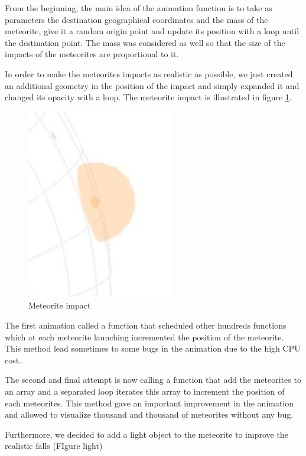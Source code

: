 \documentclass[10pt,conference,compsocconf]{IEEEtran}
\begin{document}
From the beginning, the main idea of the animation function is to take as parameters the destination geographical coordinates and the mass of the meteorite, give it a random origin point and update its position with a loop until the destination point. 
The mass was considered as well so that the size of the impacts of the meteorites are proportional to it. 

In order to make the meteorites impacts as realistic as possible, we just created an additional geometry in the position of the impact and simply expanded it and changed its opacity with a loop. The meteorite impact is illustrated in figure \ref{fig:meteorite_impact}. 

\begin{figure}[H]
  \centering
  \includegraphics[width=.5\columnwidth]{images/meteorite_impact}
  \vspace{-3mm}
  \caption{Meteorite impact}
  \label{fig:meteorite_impact}
\end{figure}

The first animation called a function that scheduled other hundreds functions which at each meteorite launching incremented the position of the meteorite. This method lead sometimes to some bugs in the animation due to the high CPU cost.  

The second and final attempt is now calling a function that add the meteorites to an array and a separated loop iterates this array to increment the position of each meteorites. 
This method gave an important improvement in the animation and allowed to visualize thousand and thousand of meteorites without any bug. 

Furthermore, we decided to add a light object to the meteorite to improve the realistic falls (FIgure light)
\end{document}

